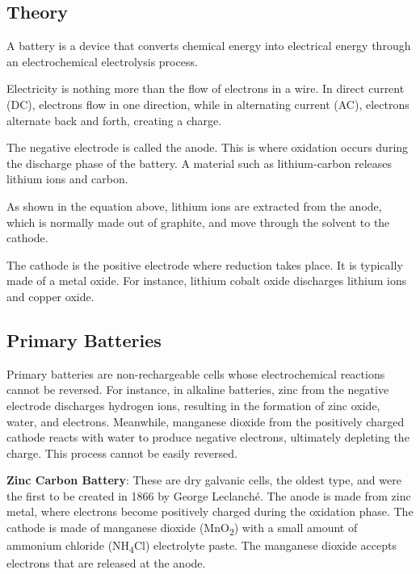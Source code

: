 \documentclass{article}
\begin{document}
\begin{flushleft}
\subsection*{Theory}

A battery is a device that converts chemical energy into electrical energy through an electrochemical electrolysis process. \newline

Electricity is nothing more than the flow of electrons in a wire. In direct current (DC), electrons flow in one direction, while in alternating current (AC), electrons alternate back and forth, creating a charge. \newline

The negative electrode is called the anode. This is where oxidation occurs during the discharge phase of the battery. A material such as lithium-carbon releases lithium ions and carbon. \newline

As shown in the equation above, lithium ions are extracted from the anode, which is normally made out of graphite, and move through the solvent to the cathode. \newline

The cathode is the positive electrode where reduction takes place. It is typically made of a metal oxide. For instance, lithium cobalt oxide discharges lithium ions and copper oxide. \newline

\subsection*{Primary Batteries}

Primary batteries are non-rechargeable cells whose electrochemical reactions cannot be reversed. For instance, in alkaline batteries, zinc from the negative electrode discharges hydrogen ions, resulting in the formation of zinc oxide, water, and electrons. 
Meanwhile, manganese dioxide from the positively charged cathode reacts with water to produce negative electrons, ultimately depleting the charge. This process cannot be easily reversed.
\newline
\vspace*{3pt}

\textbf{Zinc Carbon Battery}: These are dry galvanic cells, the oldest type, and were the first to be created in 1866 by George Leclanché. The anode is made from zinc metal, where electrons become positively charged during the oxidation phase. 
The cathode is made of manganese dioxide (MnO\textsubscript{2}) with a small amount of ammonium chloride (NH\textsubscript{4}Cl) electrolyte paste. The manganese dioxide accepts electrons that are released at the anode.


\end{flushleft}
\end{document}
